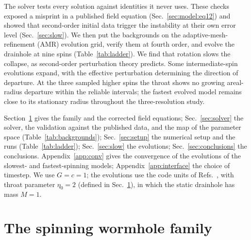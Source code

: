 \documentclass[twocolumn,floatfix,aps,prd,superscriptaddress,nofootinbib]{revtex4-2}
\begin{document}
The solver tests every solution against identities it never uses. These checks exposed a misprint in a published field equation (Sec.~\ref{sec:model:eq12}) and showed that second-order initial data trigger the instability at their own error level (Sec.~\ref{sec:slow}). We then put the backgrounds on the adaptive-mesh-refinement (AMR) evolution grid, verify them at fourth order, and evolve the drainhole at nine spins (Table~\ref{tab:ladder}). We find that rotation slows the collapse, as second-order perturbation theory predicts. Some intermediate-spin evolutions expand, with the effective perturbation determining the direction of departure. At the three sampled higher spins the throat shows no growing areal-radius departure within the reliable intervals; the fastest evolved model remains close to its stationary radius throughout the three-resolution study.

Section~\ref{sec:model} gives the family and the corrected field equations; Sec.~\ref{sec:solver} the solver, the validation against the published data, and the map of the parameter space (Table~\ref{tab:backgrounds}); Sec.~\ref{sec:setup} the numerical setup and the runs (Table~\ref{tab:ladder}); Sec.~\ref{sec:slow} the evolutions; Sec.~\ref{sec:conclusions} the conclusions. Appendix~\ref{app:conv} gives the convergence of the evolutions of the slowest- and fastest-spinning models; Appendix~\ref{app:interface} the choice of timestep. We use $G=c=1$; the evolutions use the code units of Refs.~\cite{shirokov2026,shirokov2026c}, with throat parameter $\eta_0=2$ (defined in Sec.~\ref{sec:model}), in which the static drainhole has mass $M=1$.

\section{The spinning wormhole family}
\label{sec:model}
\end{document}
